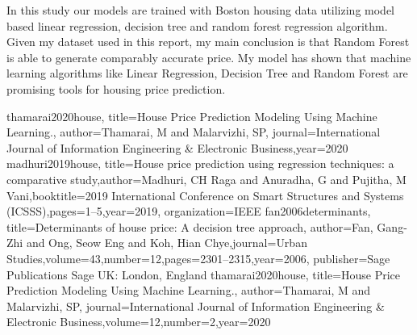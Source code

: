 \documentclass[conference]{IEEEtran}
\begin{document}
In this study our models are trained with Boston housing data utilizing model based linear regression, decision tree and random forest regression algorithm. Given my dataset used in this report, my main conclusion is that Random Forest is able to generate comparably accurate price. My model has shown that machine learning algorithms like Linear Regression, Decision Tree and Random Forest are promising tools for housing price prediction.



\begin{thebibliography}{00}
 thamarai2020house, title={House Price Prediction Modeling Using Machine Learning.}, author={Thamarai, M and Malarvizhi, SP}, journal={International Journal of Information Engineering \& Electronic Business},year={2020}
 madhuri2019house, title={House price prediction using regression techniques: a comparative study},author={Madhuri, CH Raga and Anuradha, G and Pujitha, M Vani},booktitle={2019 International Conference on Smart Structures and Systems (ICSSS)},pages={1--5},year={2019}, organization={IEEE}
 fan2006determinants,
  title={Determinants of house price: A decision tree approach},
  author={Fan, Gang-Zhi and Ong, Seow Eng and Koh, Hian Chye},journal={Urban Studies},volume={43},number={12},pages={2301--2315},year={2006}, publisher={Sage Publications Sage UK: London, England}
 thamarai2020house,
  title={House Price Prediction Modeling Using Machine Learning.}, author={Thamarai, M and Malarvizhi, SP}, journal={International Journal of Information Engineering \& Electronic Business},volume={12},number={2},year={2020}
\end{thebibliography}
\vspace{12pt}
\color{red}
\end{document}
